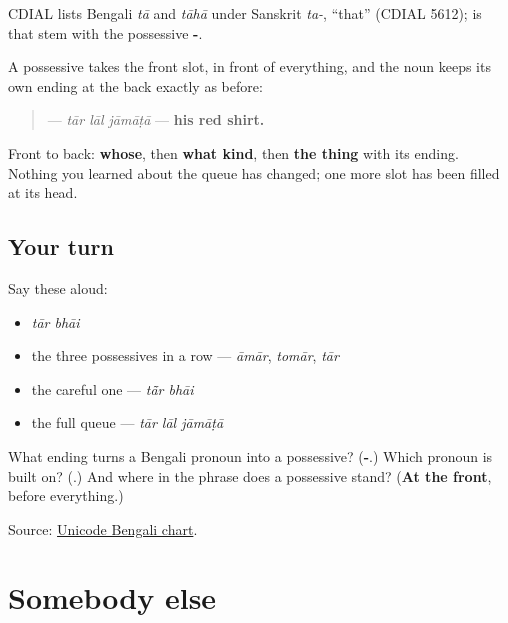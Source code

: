 \begin{cousinweb}
CDIAL lists Bengali \emph{tā} and \emph{tāhā} under Sanskrit \emph{ta-}, \textquotedblleft{}that\textquotedblright{} (CDIAL 5612); \textbf{} is that stem with the possessive \textbf{-}.
\end{cousinweb}

\begin{grammarlens}[title={Grammar Lens: order does not change}]
A possessive takes the front slot, in front of everything, and the noun keeps its own ending at the back exactly as before:

\begin{quote}
\textbf{  } — \emph{tār lāl jāmāṭā} — \textbf{his red shirt.}
\end{quote}

Front to back: \textbf{whose}, then \textbf{what kind}, then \textbf{the thing} with its ending. Nothing you learned about the queue has changed; one more slot has been filled at its head.
\end{grammarlens}

\subsection*{Your turn}
Say these aloud:

\begin{itemize}
\raggedright
  \item \emph{tār bhāi}
  \item the three possessives in a row — \emph{āmār}, \emph{tomār}, \emph{tār}
  \item the careful one — \emph{tā̃r bhāi}
  \item the full queue — \emph{tār lāl jāmāṭā}
\end{itemize}

\begin{tcolorbox}[breakable,colback=teal!4,colframe=teal!35!black,title={Before you move on}]
What ending turns a Bengali pronoun into a possessive? (\textbf{-}.) Which pronoun is \textbf{} built on? (\textbf{}.) And where in the phrase does a possessive stand? (\textbf{At the front}, before everything.)

Source: \href{https://www.unicode.org/charts/PDF/U0980.pdf}{Unicode Bengali chart}.
\end{tcolorbox}
\section[\texorpdfstring{\bn{সে} · \bn{তিনি} · \bn{ও} … (she · tini · o …)}{সে · তিনি · ও … (she · tini · o …)}]{Somebody else}

